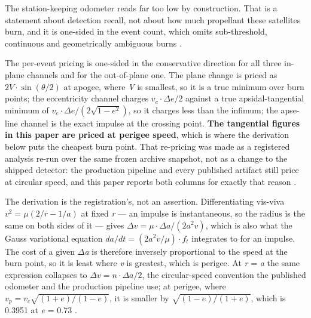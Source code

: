 \documentclass[11pt]{article}
\begin{document}

The station-keeping odometer reads far too low by construction. That is a statement about detection recall, not about how much propellant these satellites burn, and it is one-sided in the event count, which omits sub-threshold, continuous and geometrically ambiguous burns%
.

The per-event pricing is one-sided in the conservative direction for all three in-plane channels and for the out-of-plane one. The plane change is priced as $2V\cdot\sin(\theta/2)$ at apogee, where \emph{V} is smallest, so it is a true minimum over burn points; the eccentricity channel charges $v_c\cdot\Delta e/2$ against a true apsidal-tangential minimum of $v_c\cdot\Delta e/(2\sqrt{1-e^2})$, so it charges less than the infimum; the apse-line channel is the exact impulse at the crossing point. \textbf{The tangential figures in this paper are priced at perigee speed}, which is where the derivation below puts the cheapest burn point. That re-pricing was made as a registered analysis re-run over the same frozen archive snapshot, not as a change to the shipped detector: the production pipeline and every published artifact still price at circular speed, and this paper reports both columns for exactly that reason%
.

The derivation is the registration's, not an assertion. Differentiating vis-viva $v^2 = \mu(2/r - 1/a)$ at fixed \emph{r} --- an impulse is instantaneous, so the radius is the same on both sides of it --- gives $\Delta v = \mu\cdot\Delta a/(2a^2v)$, which is also what the Gauss variational equation $da/dt = (2a^2v/\mu)\cdot f_t$ integrates to for an impulse. The cost of a given $\Delta$\emph{a} is therefore inversely proportional to the speed at the burn point, so it is least where \emph{v} is greatest, which is perigee. At \emph{r} = \emph{a} the same expression collapses to $\Delta v = n\cdot\Delta a/2$, the circular-speed convention the published odometer and the production pipeline use; at perigee, where $v_p = v_c\sqrt{(1+e)/(1-e)}$, it is smaller by $\sqrt{(1-e)/(1+e)}$, which is 0.3951 at \emph{e} = 0.73%
.
\end{document}
